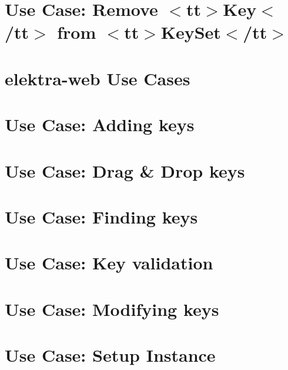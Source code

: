 \let\mypdfximage\pdfximage\def\pdfximage{\immediate\mypdfximage}\documentclass[twoside]{book}
\newcommand{\+}{\discretionary{\mbox{\scriptsize$\hookleftarrow$}}{}{}}
\begin{document}
\chapter{Use Case\+: Remove $<$tt$>$Key$<$/tt$>$ from $<$tt$>$Key\+Set$<$/tt$>$}
\label{doc_usecases_core_UC_keyset_remove_md}

\chapter{elektra-\/web Use Cases}
\label{doc_usecases_elektra_web_README_md}

\chapter{Use Case\+: Adding keys}
\label{doc_usecases_elektra_web_UC_adding_keys_md}

\chapter{Use Case\+: Drag \& Drop keys}
\label{doc_usecases_elektra_web_UC_drag_n_drop_md}

\chapter{Use Case\+: Finding keys}
\label{doc_usecases_elektra_web_UC_finding_keys_md}

\chapter{Use Case\+: Key validation}
\label{doc_usecases_elektra_web_UC_key_validation_md}

\chapter{Use Case\+: Modifying keys}
\label{doc_usecases_elektra_web_UC_modifying_keys_md}

\chapter{Use Case\+: Setup Instance}
\label{doc_usecases_elektra_web_UC_setup_instance_md}

\end{document}
